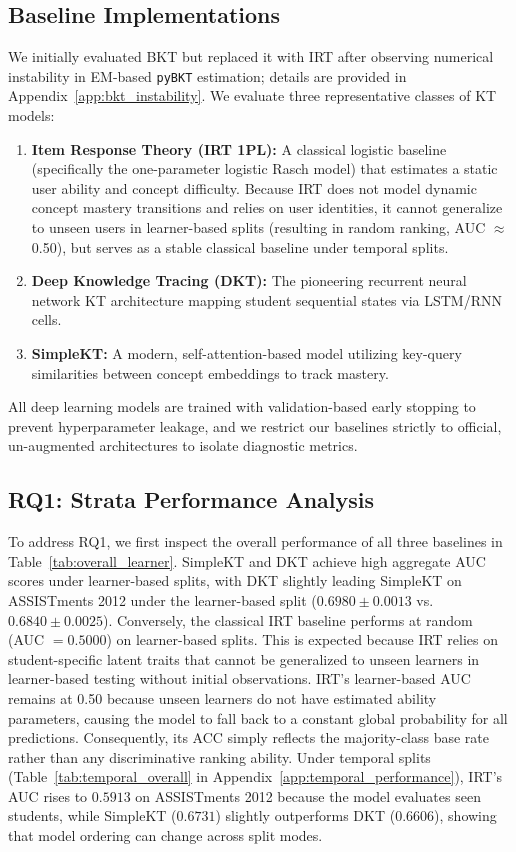 \subsection{Baseline Implementations}
We initially evaluated BKT but replaced it with IRT after observing numerical instability in EM-based \texttt{pyBKT} estimation; details are provided in Appendix~\ref{app:bkt_instability}. We evaluate three representative classes of KT models:
\begin{enumerate}
    \item \textbf{Item Response Theory (IRT 1PL):} A classical logistic baseline (specifically the one-parameter logistic Rasch model) that estimates a static user ability and concept difficulty. Because IRT does not model dynamic concept mastery transitions and relies on user identities, it cannot generalize to unseen users in learner-based splits (resulting in random ranking, AUC $\approx$ 0.50), but serves as a stable classical baseline under temporal splits.
    \item \textbf{Deep Knowledge Tracing (DKT):} The pioneering recurrent neural network KT architecture mapping student sequential states via LSTM/RNN cells.
    \item \textbf{SimpleKT:} A modern, self-attention-based model utilizing key-query similarities between concept embeddings to track mastery.
\end{enumerate}

All deep learning models are trained with validation-based early stopping to prevent hyperparameter leakage, and we restrict our baselines strictly to official, un-augmented architectures to isolate diagnostic metrics.

\subsection{RQ1: Strata Performance Analysis}
To address RQ1, we first inspect the overall performance of all three baselines in Table~\ref{tab:overall_learner}. SimpleKT and DKT achieve high aggregate AUC scores under learner-based splits, with DKT slightly leading SimpleKT on ASSISTments 2012 under the learner-based split ($0.6980 \pm 0.0013$ vs. $0.6840 \pm 0.0025$). Conversely, the classical IRT baseline performs at random (AUC $= 0.5000$) on learner-based splits. This is expected because IRT relies on student-specific latent traits that cannot be generalized to unseen learners in learner-based testing without initial observations. IRT's learner-based AUC remains at 0.50 because unseen learners do not have estimated ability parameters, causing the model to fall back to a constant global probability for all predictions. Consequently, its ACC simply reflects the majority-class base rate rather than any discriminative ranking ability. Under temporal splits (Table~\ref{tab:temporal_overall} in Appendix~\ref{app:temporal_performance}), IRT's AUC rises to $0.5913$ on ASSISTments 2012 because the model evaluates seen students, while SimpleKT ($0.6731$) slightly outperforms DKT ($0.6606$), showing that model ordering can change across split modes.

